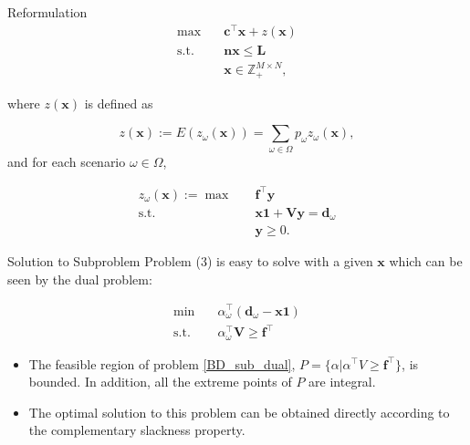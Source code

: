 \begin{frame}{Reformulation}
  \begin{equation}\label{BD_master}
    \begin{aligned}
  \max \quad & \mathbf{c}^{\intercal} \mathbf{x}+ z(\mathbf{x}) \\
  \text {s.t.} \quad & \mathbf{n} \mathbf{x} \leq \mathbf{L} \\
  & \mathbf{x} \in \mathbb{Z}_{+}^{M \times N},
  \end{aligned}
  \end{equation}

  where $z(\mathbf{x})$ is defined as 

$$z(\mathbf{x}) := E(z_{\omega}(\mathbf{x})) = \sum_{\omega \in \Omega} p_{\omega} z_{\omega}(\mathbf{x}),$$ and for each scenario $\omega \in \Omega$, 

  \begin{equation}\label{BD_sub}
    \begin{aligned}
      z_{\omega}(\mathbf{x}) := \max \quad & \mathbf{f}^{\intercal} \mathbf{y} \\
      \text {s.t.} \quad & \mathbf{x} \mathbf{1} + \mathbf{V} \mathbf{y} = \mathbf{d}_{\omega} \\
       & \mathbf{y} \geq 0.
    \end{aligned}
    \end{equation}
\end{frame}

\begin{frame}{Solution to Subproblem}
  Problem (3) is easy to solve with a given $\mathbf{x}$ which can be seen by the dual problem:

  \begin{equation}\label{BD_sub_dual}
    \begin{aligned}
      \min \quad & \alpha^{\intercal}_{\omega} (\mathbf{d}_{\omega}- \mathbf{x} \mathbf{1}) \\
      \text {s.t.} \quad & \alpha^{\intercal}_{\omega} \mathbf{V} \geq \mathbf{f}^{\intercal}
    \end{aligned}
    \end{equation}

    \begin{itemize}
      \item The feasible region of problem \eqref{BD_sub_dual}, $P= \{\alpha|\alpha^{\intercal} V \geq \mathbf{f}^{\intercal}\}$, is bounded. In addition, all the extreme points of $P$ are integral.
      \item The optimal solution to this problem can be obtained directly according to the complementary slackness property.
    \end{itemize}
\end{frame}

